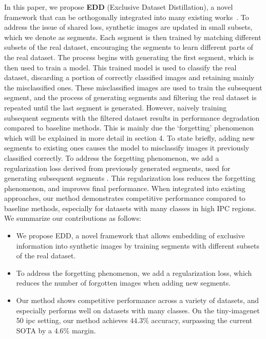 \documentclass{article}
\theoremstyle{plain}
\theoremstyle{definition}
\theoremstyle{remark}
\begin{document}
In this paper, we propose \textbf{EDD} (Exclusive Dataset Distillation), a novel framework that can be orthogonally integrated into many existing works~\cite{}. To address the issue of shared loss, synthetic images are updated in small subsets, which we denote as segments. Each segment is then trained by matching different subsets of the real dataset, encouraging the segments to learn different parts of the real dataset. The process begins with generating the first segment, which is then used to train a model. This trained model is used to classify the real dataset, discarding a portion of correctly classified images and retaining mainly the misclassified ones. These misclassified images are used to train the subsequent segment, and the process of generating segments and filtering the real dataset is repeated until the last segment is generated. However, naively training subsequent segments with the filtered dataset results in performance degradation compared to baseline methods. This is mainly due the `forgetting' phenomenon~\cite{} which will be explained in more detail in section 4. To state briefly, adding new segments to existing ones causes the model to misclassify images it previously classified correctly. To address the forgetting phenomenon, we add a regularization loss derived from previously generated segments, used for generating subsequent segments . This regularization loss reduces the forgetting phenomenon, and improves final performance. When integrated into existing approaches, our method demonstrates competitive performance compared to baseline methods, especially for datasets with many classes in high IPC regions. We summarize our contributions as follows:
\begin{itemize}
    \item We propose EDD, a novel framework that allows embedding of exclusive information into synthetic images by training segments with different subsets of the real dataset.
    \item To address the forgetting phenomenon, we add a regularization loss, which reduces the number of forgotten images when adding new segments.
    \item Our method shows competitive performance across a variety of datasets, and especially performs well on datasets with many classes. On the tiny-imagenet 50 ipc setting, our method achieves $44.3\%$ accuracy, surpassing the current SOTA by a $4.6\%$ margin.
\end{itemize}
\end{document}
